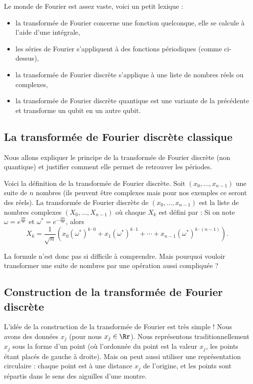 \documentclass[11pt,class=report,crop=false]{standalone}
\begin{document}
Le monde de Fourier est assez vaste, voici un petit lexique :
\begin{itemize}
  \item la transformée de Fourier concerne une fonction quelconque, elle se calcule à l'aide d'une intégrale,
  \item les séries de Fourier s'appliquent à des fonctions périodiques (comme ci-dessus),
  \item la transformée de Fourier discrète s'applique à une liste de nombres réels ou complexes,
  \item la transformée de Fourier discrète quantique est une variante de la précédente et transforme un qubit en un autre qubit.
\end{itemize}



\subsection{La transformée de Fourier discrète classique}

Nous allons expliquer le principe de la transformée de Fourier discrète (non quantique) et justifier comment elle permet de retrouver les périodes.

Voici la définition de la transformée de Fourier discrète.
Soit $(x_0,\ldots,x_{n-1})$  une suite de $n$ nombres (ils peuvent être complexes mais pour nos exemples ce seront des réels).
La transformée de Fourier discrète de $(x_0,\ldots,x_{n-1})$ est la liste de nombres complexes $(X_0,\ldots, X_{n-1})$ où chaque $X_k$ est défini par :
Si on note $\omega = e^{\frac{2\ii\pi}{n}}$ et $\omega^*= e^{-\frac{2\ii\pi}{n}}$,
alors
$$X_k = \frac{1}{\sqrt n} \left( x_0(\omega^*)^{k\cdot 0} + x_1(\omega^*)^{k\cdot 1} +
\cdots +  x_{n-1}(\omega^*)^{k \cdot (n-1)}\right).$$

La formule n'est donc pas si difficile à comprendre.  Mais pourquoi vouloir transformer une suite de nombres par une opération aussi compliquée ?

\subsection{Construction de la transformée de Fourier discrète}

L'idée de la construction de la transformée de Fourier est très simple !
Nous avons des données $x_j$ (pour nous $x_j \in \Rr$). Nous représentons traditionnellement $x_j$ sous la forme d'un point (où l'ordonnée du point est la valeur $x_j$, les points étant placés de gauche à droite). Mais on peut aussi utiliser une représentation circulaire : chaque point est à une distance $x_j$ de l'origine, et les points sont répartis dans le sens des aiguilles d'une montre. 
\end{document}
